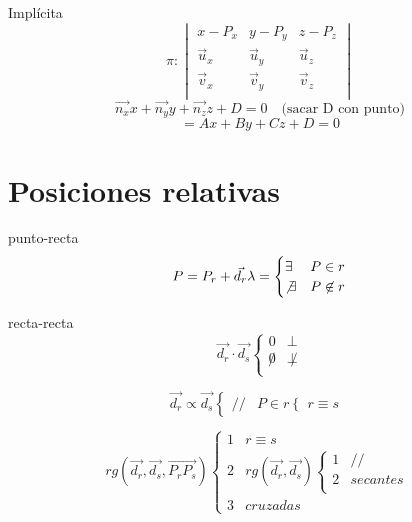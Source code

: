 \documentclass[12pt, letterpaper, twoside]{article}
\begin{document}
	
	Implícita
	\begin{equation}
		\pi :
		\begin{vmatrix}
			x - P_x   & y - P_y   & z - P_z   \\
			\vec{u}_x & \vec{u}_y & \vec{u}_z \\
			\vec{v}_x & \vec{v}_y & \vec{v}_z \\
		\end{vmatrix}
	\end{equation}
	\begin{equation}
		\vec{n_x} x + \vec{n_y} y + \vec{n_z} z + D = 0 \quad \text{(sacar D con punto)}
	\end{equation}
	\begin{equation}
		= Ax + By + Cz + D = 0
	\end{equation}


	\section{Posiciones relativas}
	
	punto-recta
	\begin{equation}
		P = P_r + \vec{d_r} \lambda =
		\begin{cases}
			\exists     & P \in r    \\
			\not\exists & P \not\in r \\
		\end{cases}
	\end{equation}

	recta-recta
	\begin{equation}
		\vec{d_r} \cdot \vec{d_s}
		\begin{cases}
			0     & \perp     \\
			\not0 & \not\perp \\
		\end{cases}
	\end{equation}

	\begin{equation}
		\vec{d_r} \propto \vec{d_s}
		\begin{cases}
			// & P \in r
			\begin{cases}
				r \equiv s
			\end{cases}
		\end{cases}
	\end{equation}

	\begin{equation}
		rg(\vec{d_r}, \vec{d_s}, \vec{P_r P_s})
		\begin{cases}
			1     & r \equiv s     \\
			2     & rg(\vec{d_r}, \vec{d_s})
			\begin{cases}
				1     & //       \\
				2     & secantes \\
			\end{cases} \\
			3     & cruzadas
		\end{cases}
	\end{equation}
	
\end{document}
